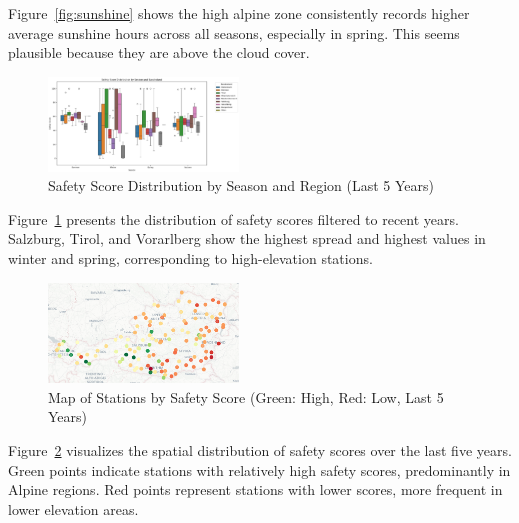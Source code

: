 \noindent Figure~\ref{fig:sunshine} shows the high alpine zone consistently records higher average sunshine hours across all seasons, especially in spring. This seems plausible because they are above the cloud cover.

\begin{figure}[H]
    \centering
    \includegraphics[width=0.45\textwidth]{img/safety_score_boxplot.png}
    \caption{Safety Score Distribution by Season and Region (Last 5 Years)}
    \label{fig:safety_boxplot}
\end{figure}

\noindent Figure~\ref{fig:safety_boxplot} presents the distribution of safety scores
filtered to recent years. Salzburg, Tirol, and Vorarlberg show the highest
spread and highest values in winter and spring, corresponding to high-elevation
stations.\\

\begin{figure}[H]
    \centering
    \includegraphics[width=0.45\textwidth]{img/station_map.png}
    \caption{Map of Stations by Safety Score (Green: High, Red: Low, Last 5 Years)}
    \label{fig:station_map}
\end{figure}

\noindent Figure~\ref{fig:station_map} visualizes the spatial distribution of safety
scores over the last five years. Green points indicate stations with relatively
high safety scores, predominantly in Alpine regions. Red points represent
stations with lower scores, more frequent in lower elevation areas.\\
